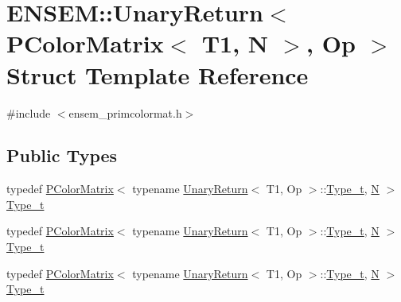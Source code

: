 \hypertarget{structENSEM_1_1UnaryReturn_3_01PColorMatrix_3_01T1_00_01N_01_4_00_01Op_01_4}{}\section{E\+N\+S\+EM\+:\+:Unary\+Return$<$ P\+Color\+Matrix$<$ T1, N $>$, Op $>$ Struct Template Reference}
\label{structENSEM_1_1UnaryReturn_3_01PColorMatrix_3_01T1_00_01N_01_4_00_01Op_01_4}


{\ttfamily \#include $<$ensem\+\_\+primcolormat.\+h$>$}

\subsection*{Public Types}
\begin{DoxyCompactItemize}
\item 
typedef \mbox{\hyperlink{classENSEM_1_1PColorMatrix}{P\+Color\+Matrix}}$<$ typename \mbox{\hyperlink{structENSEM_1_1UnaryReturn}{Unary\+Return}}$<$ T1, Op $>$\+::\mbox{\hyperlink{structENSEM_1_1UnaryReturn_3_01PColorMatrix_3_01T1_00_01N_01_4_00_01Op_01_4_a2b137e72bb2c6ed25df4d747fd568a79}{Type\+\_\+t}}, \mbox{\hyperlink{adat__devel_2lib_2hadron_2operator__name__util_8cc_a7722c8ecbb62d99aee7ce68b1752f337}{N}} $>$ \mbox{\hyperlink{structENSEM_1_1UnaryReturn_3_01PColorMatrix_3_01T1_00_01N_01_4_00_01Op_01_4_a2b137e72bb2c6ed25df4d747fd568a79}{Type\+\_\+t}}
\item 
typedef \mbox{\hyperlink{classENSEM_1_1PColorMatrix}{P\+Color\+Matrix}}$<$ typename \mbox{\hyperlink{structENSEM_1_1UnaryReturn}{Unary\+Return}}$<$ T1, Op $>$\+::\mbox{\hyperlink{structENSEM_1_1UnaryReturn_3_01PColorMatrix_3_01T1_00_01N_01_4_00_01Op_01_4_a2b137e72bb2c6ed25df4d747fd568a79}{Type\+\_\+t}}, \mbox{\hyperlink{adat__devel_2lib_2hadron_2operator__name__util_8cc_a7722c8ecbb62d99aee7ce68b1752f337}{N}} $>$ \mbox{\hyperlink{structENSEM_1_1UnaryReturn_3_01PColorMatrix_3_01T1_00_01N_01_4_00_01Op_01_4_a2b137e72bb2c6ed25df4d747fd568a79}{Type\+\_\+t}}
\item 
typedef \mbox{\hyperlink{classENSEM_1_1PColorMatrix}{P\+Color\+Matrix}}$<$ typename \mbox{\hyperlink{structENSEM_1_1UnaryReturn}{Unary\+Return}}$<$ T1, Op $>$\+::\mbox{\hyperlink{structENSEM_1_1UnaryReturn_3_01PColorMatrix_3_01T1_00_01N_01_4_00_01Op_01_4_a2b137e72bb2c6ed25df4d747fd568a79}{Type\+\_\+t}}, \mbox{\hyperlink{adat__devel_2lib_2hadron_2operator__name__util_8cc_a7722c8ecbb62d99aee7ce68b1752f337}{N}} $>$ \mbox{\hyperlink{structENSEM_1_1UnaryReturn_3_01PColorMatrix_3_01T1_00_01N_01_4_00_01Op_01_4_a2b137e72bb2c6ed25df4d747fd568a79}{Type\+\_\+t}}
\end{DoxyCompactItemize}


